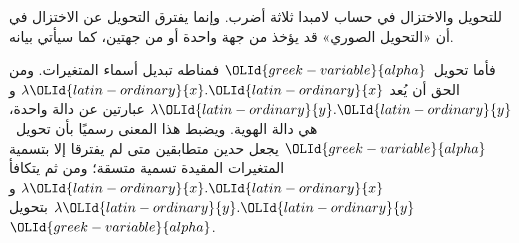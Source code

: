 \documentclass[../../../include/open-logic-section]{subfiles}
\begin{document}

للتحويل والاختزال في حساب لامبدا ثلاثة أضرب. وإنما يفترق التحويل عن
الاختزال في أن «التحويل الصوري» قد يؤخذ من جهة واحدة أو من جهتين، كما
سيأتي بيانه.

فأما تحويل~$\OLId{greek-variable}{alpha}$ فمناطه تبديل أسماء المتغيرات. ومن الحق أن يُعد
$\lambda \OLId{latin-ordinary}{x}. \OLId{latin-ordinary}{x}$ و$\lambda \OLId{latin-ordinary}{y}.\OLId{latin-ordinary}{y}$ عبارتين عن دالة واحدة، هي دالة الهوية.
ويضبط هذا المعنى رسميًا بأن تحويل~$\OLId{greek-variable}{alpha}$ يجعل حدين متطابقين متى لم
يفترقا إلا بتسمية المتغيرات المقيدة تسمية متسقة؛ ومن ثم يتكافأ
$\lambda \OLId{latin-ordinary}{x}.\OLId{latin-ordinary}{x}$ و$\lambda \OLId{latin-ordinary}{y}.\OLId{latin-ordinary}{y}$ بتحويل~$\OLId{greek-variable}{alpha}$.
\end{document}
